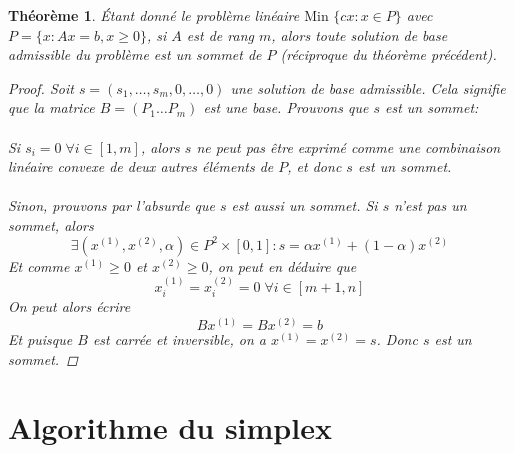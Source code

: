 \documentclass[a4paper]{report}
\theoremstyle{definition}
\theoremstyle{remark}
\theoremstyle{plain}
\newtheorem{theorem}{Théorème}
\begin{document}
\begin{theorem}
Étant donné le problème linéaire \(\text{Min }\{cx:x\in P\}\) avec
\(P = \{x:Ax=b,x\ge 0\}\), si \(A\) est de rang \(m\), alors toute solution de
base admissible du problème est un sommet de \(P\) (réciproque du théorème
précédent).
\begin{proof}
Soit \(s=(s_1,\dots,s_m,0,\dots,0)\) une solution de base admissible. Cela
signifie que la matrice \(B=(P_1\dots P_m)\) est une base. Prouvons que \(s\)
est un sommet:
\paragraph{}
Si \(s_i=0\;\forall i\in[1,m]\), alors \(s\) ne peut pas être exprimé comme une
combinaison linéaire convexe de deux autres éléments de \(P\), et donc \(s\) est
un sommet.
\paragraph{}
Sinon, prouvons par l'absurde que \(s\) est aussi un sommet. Si \(s\) n'est pas
un sommet, alors
\[\exists (x^{(1)},x^{(2)},\alpha)\in P^2\times[0,1]:s=\alpha x^{(1)}+(1-\alpha)x^{(2)}\]
Et comme \(x^{(1)}\ge0\) et \(x^{(2)}\ge0\), on peut en déduire que
\[x^{(1)}_i=x^{(2)}_i=0\;\forall i\in[m+1,n]\]
On peut alors écrire
\[Bx^{(1)}=Bx^{(2)}=b\]
Et puisque \(B\) est carrée et inversible, on a \(x^{(1)}=x^{(2)}=s\).
Donc \(s\) est un sommet.
\end{proof}
\end{theorem}

\section{Algorithme du simplex}
\end{document}

